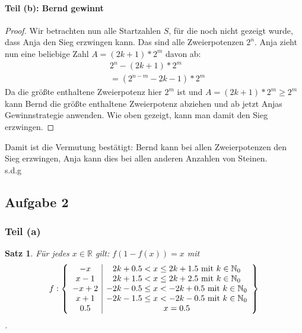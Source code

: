 \documentclass[12pt]{article}
\numberwithin{equation}{subsection}
\newtheorem{satz}{Satz}
\begin{document}
\paragraph{Teil (b): Bernd gewinnt}
\begin{proof}
Wir betrachten nun alle Startzahlen $S$, für die noch nicht gezeigt wurde, dass Anja den Sieg erzwingen kann. Das sind alle Zweierpotenzen $2^n$.
Anja zieht nun eine beliebige Zahl $A=(2k+1)*2^m$ davon ab:
\begin{align*}
	&2^n-(2k+1)*2^m\\
	&=\left(2^{n-m}-2k-1\right)*2^m
\end{align*}
Da die größte enthaltene Zweierpotenz hier $2^m$ ist und $A=(2k+1)*2^m\ge 2^m$ kann Bernd die größte enthaltene Zweierpotenz abziehen und ab jetzt Anjas Gewinnstrategie anwenden. Wie oben gezeigt, kann man damit den Sieg erzwingen.
\end{proof}
Damit ist die Vermutung bestätigt: Bernd kann bei allen Zweierpotenzen den Sieg erzwingen, Anja kann dies bei allen anderen Anzahlen von Steinen.\\
s.d.g

\subsection{Aufgabe 2}
\subsubsection{Teil (a)}
\begin{satz}
\label{funktion2}
Für jedes $x\in\mathbb{R}$ gilt: $f(1-f(x))=x$ mit
\[
f:\left\{ \begin{array}{c | c}
	-x & 2k+0.5 < x \leq 2k+1.5\ \mathrm{mit}\ k\in\mathbb{N}_0\\
	x-1 & 2k+1.5 < x \leq 2k+2.5\ \mathrm{mit}\ k\in\mathbb{N}_0\\
	-x+2 & -2k-0.5 \leq x < -2k+0.5\ \mathrm{mit}\ k\in\mathbb{N}_0\\
	x+1 & -2k-1.5 \leq x < -2k-0.5\ \mathrm{mit}\ k\in\mathbb{N}_0\\
	0.5 & x=0.5
\end{array} \right\}
\].
\end{satz}
\end{document}
